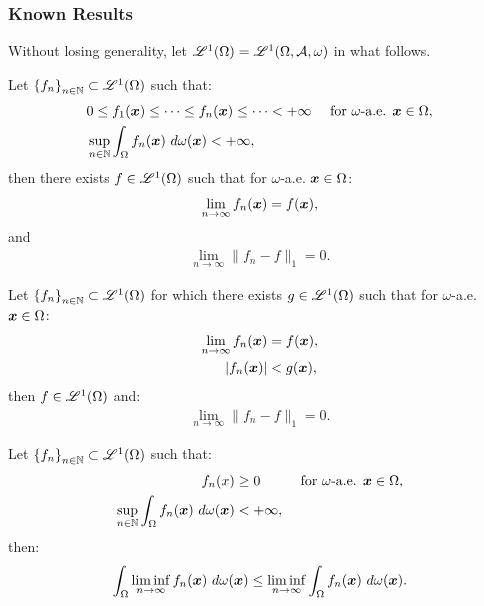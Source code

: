 \newpage
\subsubsection{Known Results}

Without losing generality, let $\mathscr{L}^{1}(\Omega) = \mathscr{L}^{1}(\Omega, \mathcal{A}, \omega)$ in what follows.

\begin{theorem}
    Let $\left\{ f_n \right\}_{n \in \mathbb{N}} \subset \mathscr{L}^{1}(\Omega)$ such that:
    \begin{align}
        & 0 \leq f_1(\bm{x}) \leq \dots \leq f_n(\bm{x}) \leq \dots < +\infty &\text{ for } \omega \text{-a.e. } \bm{x} \in \Omega, \\
        & \sup_{n \in \mathbb{N}} \int_\Omega f_n(\bm{x}) ~ d \omega(\bm{x}) < +\infty,
    \end{align}
    then there exists $f \in \mathscr{L}^{1}(\Omega)$ such that for $\omega$-a.e. $\bm{x} \in \Omega$:
    \begin{align}
        \lim_{n \rightarrow \infty} f_n(\bm{x}) = f(\bm{x}),
    \end{align}
    and
    \begin{align}
        \lim_{n \rightarrow \infty} \lVert f_n - f \rVert_1 = 0.
    \end{align}
\end{theorem}

\begin{theorem}
    Let $\left\{ f_n \right\}_{n \in \mathbb{N}} \subset \mathscr{L}^{1}(\Omega)$ for which there exists $g \in \mathscr{L}^{1}(\Omega)$ such that for $\omega$-a.e. $\bm{x} \in \Omega$:
    \begin{align}
        \lim_{n \rightarrow \infty} f_n(\bm{x}) & = f(\bm{x}), \\
        \lvert f_n(\bm{x}) \rvert & < g(\bm{x}),
    \end{align}
    then $f \in \mathscr{L}^{1}(\Omega)$ and:
    \begin{align}
        \lim_{n \rightarrow \infty} \lVert f_n - f \rVert_1 = 0.
    \end{align}
\end{theorem}

\begin{lemma}[Fatou]
    Let $\left\{ f_n \right\}_{n \in \mathbb{N}} \subset \mathscr{L}^{1}(\Omega)$ such that:
    \begin{align}
        f_n(x) & \geq 0 &\text{ for } \omega \text{-a.e. } \bm{x} \in \Omega, \\
        \sup_{n \in \mathbb{N}} \int_{\Omega} f_n(\bm{x}) ~ d \omega(\bm{x}) & < +\infty,
    \end{align}
    then:
    \begin{align}
        \int_{\Omega} \liminf_{n \rightarrow \infty} f_n(\bm{x}) ~ d \omega(\bm{x}) \leq \liminf_{n \rightarrow \infty} \int_{\Omega} f_n(\bm{x}) ~ d \omega(\bm{x}).
    \end{align}
\end{lemma}

